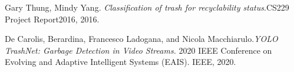\documentclass{Classes/UITBA}
\begin{document}

\pagestyle{empty}
%
\clearpage
\restoregeometry

%
%
%

\pagestyle{empty}
\tableofcontents
 
\clearpage
\pagestyle{plain}
\setcounter{page}{1}





\cite{DBPedia}







% 

\begin{thebibliography}{SJL05}

 Gary Thung, Mindy Yang. \textit{Classification of trash for recyclability status}.CS229 Project Report2016, 2016.

 De Carolis, Berardina, Francesco Ladogana, and Nicola Macchiarulo.\textit{YOLO TrashNet: Garbage Detection in Video Streams.} 2020 IEEE Conference on Evolving and Adaptive Intelligent Systems (EAIS). IEEE, 2020.
    

\end{thebibliography}
\end{document}
